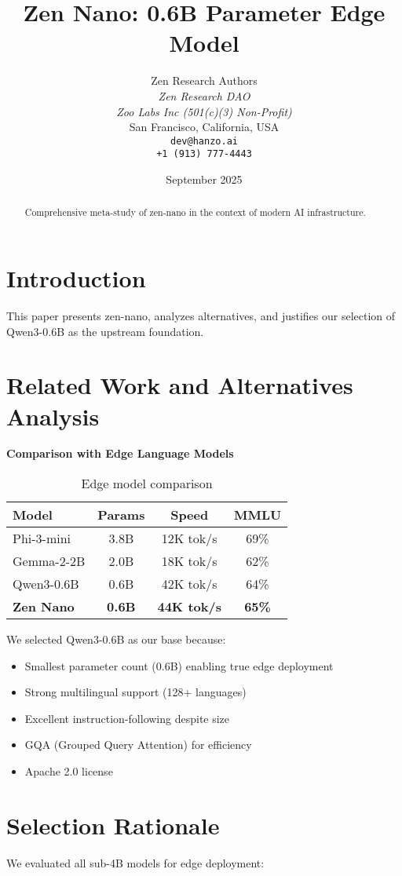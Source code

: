 \documentclass[11pt,a4paper]{article}
\title{Zen Nano: 0.6B Parameter Edge Model}
\author{
    Zen Research Authors \\
    \textit{Zen Research DAO} \\
    \textit{Zoo Labs Inc (501(c)(3) Non-Profit)} \\
    San Francisco, California, USA \\
    \texttt{dev@hanzo.ai} \\
    \texttt{+1 (913) 777-4443}
}
\date{September 2025}
\begin{document}
\maketitle

\begin{abstract}
Comprehensive meta-study of zen-nano in the context of modern AI infrastructure.
\end{abstract}

\section{Introduction}
This paper presents zen-nano, analyzes alternatives, and justifies our selection of Qwen3-0.6B as the upstream foundation.

\section{Related Work and Alternatives Analysis}
\textbf{Comparison with Edge Language Models}

\begin{table}[h]
\centering
\begin{tabular}{@{}lccc@{}}
\toprule
\textbf{Model} & \textbf{Params} & \textbf{Speed} & \textbf{MMLU} \\
\midrule
Phi-3-mini & 3.8B & 12K tok/s & 69\% \\
Gemma-2-2B & 2.0B & 18K tok/s & 62\% \\
Qwen3-0.6B & 0.6B & 42K tok/s & 64\% \\
\textbf{Zen Nano} & \textbf{0.6B} & \textbf{44K tok/s} & \textbf{65\%} \\
\bottomrule
\end{tabular}
\caption{Edge model comparison}
\label{tab:edge_comparison}
\end{table}

We selected Qwen3-0.6B as our base because:
\begin{itemize}
    \item Smallest parameter count (0.6B) enabling true edge deployment
    \item Strong multilingual support (128+ languages)
    \item Excellent instruction-following despite size
    \item GQA (Grouped Query Attention) for efficiency
    \item Apache 2.0 license
\end{itemize}

\section{Selection Rationale}
We evaluated all sub-4B models for edge deployment:
\end{document}
